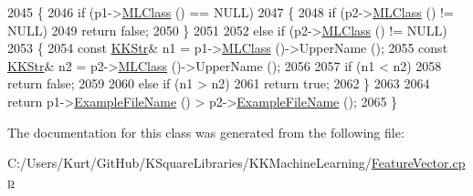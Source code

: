 \begin{DoxyCode}
2045   \{
2046     \textcolor{keywordflow}{if}  (p1->\hyperlink{class_k_k_m_l_l_1_1_feature_vector_a3c8fe002c6e868f8c00059c004fb32fd}{MLClass} () == NULL)
2047     \{
2048       \textcolor{keywordflow}{if}  (p2->\hyperlink{class_k_k_m_l_l_1_1_feature_vector_a3c8fe002c6e868f8c00059c004fb32fd}{MLClass} () != NULL)
2049         \textcolor{keywordflow}{return}  \textcolor{keyword}{false};
2050     \}
2051 
2052     \textcolor{keywordflow}{else} \textcolor{keywordflow}{if}  (p2->\hyperlink{class_k_k_m_l_l_1_1_feature_vector_a3c8fe002c6e868f8c00059c004fb32fd}{MLClass} () != NULL)
2053     \{
2054       \textcolor{keyword}{const} \hyperlink{class_k_k_b_1_1_k_k_str}{KKStr}& n1 = p1->\hyperlink{class_k_k_m_l_l_1_1_feature_vector_a3c8fe002c6e868f8c00059c004fb32fd}{MLClass} ()->UpperName ();
2055       \textcolor{keyword}{const} \hyperlink{class_k_k_b_1_1_k_k_str}{KKStr}& n2 = p2->\hyperlink{class_k_k_m_l_l_1_1_feature_vector_a3c8fe002c6e868f8c00059c004fb32fd}{MLClass} ()->UpperName ();
2056 
2057       \textcolor{keywordflow}{if}  (n1 < n2)
2058         \textcolor{keywordflow}{return} \textcolor{keyword}{false};
2059 
2060       \textcolor{keywordflow}{else} \textcolor{keywordflow}{if}  (n1 > n2)
2061         \textcolor{keywordflow}{return} \textcolor{keyword}{true};
2062     \}
2063 
2064     \textcolor{keywordflow}{return} p1->\hyperlink{class_k_k_m_l_l_1_1_feature_vector_ab47c89ab1e9396664fdc0dc34b6e1ab5}{ExampleFileName} () > p2->\hyperlink{class_k_k_m_l_l_1_1_feature_vector_ab47c89ab1e9396664fdc0dc34b6e1ab5}{ExampleFileName} ();
2065   \}
\end{DoxyCode}


The documentation for this class was generated from the following file\+:\begin{DoxyCompactItemize}
\item 
C\+:/\+Users/\+Kurt/\+Git\+Hub/\+K\+Square\+Libraries/\+K\+K\+Machine\+Learning/\hyperlink{_feature_vector_8cpp}{Feature\+Vector.\+cpp}\end{DoxyCompactItemize}
